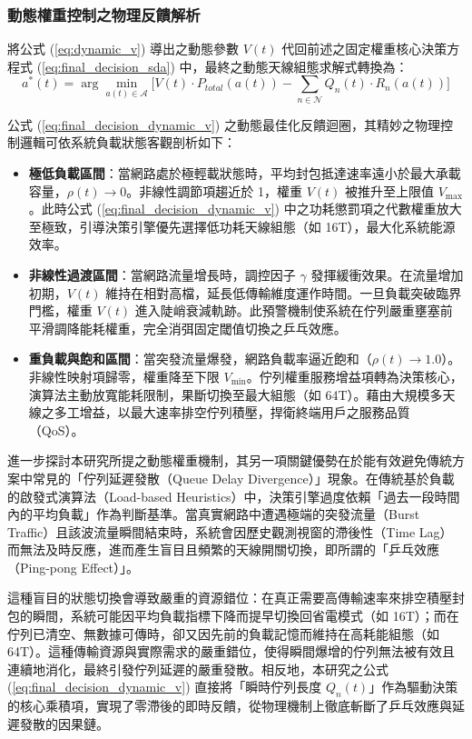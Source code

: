 \subsubsection{動態權重控制之物理反饋解析}
將公式 (\ref{eq:dynamic_v}) 導出之動態參數 $V(t)$ 代回前述之固定權重核心決策方程式 (\ref{eq:final_decision_sda}) 中，最終之動態天線組態求解式轉換為：
\begin{equation}
    a^*(t) = \arg\min_{a(t) \in \mathcal{A}} \Big[ V(t) \cdot P_{total}(a(t)) - \sum_{n \in \mathcal{N}} Q_n(t) \cdot R_n(a(t)) \Big]
    \label{eq:final_decision_dynamic_v}
\end{equation}

公式 (\ref{eq:final_decision_dynamic_v}) 之動態最佳化反饋迴圈，其精妙之物理控制邏輯可依系統負載狀態客觀剖析如下：
\begin{itemize}
    \item \textbf{極低負載區間}：當網路處於極輕載狀態時，平均封包抵達速率遠小於最大承載容量，$\rho(t) \to 0$。非線性調節項趨近於 1，權重 $V(t)$ 被推升至上限值 $V_{\text{max}}$。此時公式 (\ref{eq:final_decision_dynamic_v}) 中之功耗懲罰項之代數權重放大至極致，引導決策引擎優先選擇低功耗天線組態（如 16T），最大化系統能源效率。
    \item \textbf{非線性過渡區間}：當網路流量增長時，調控因子 $\gamma$ 發揮緩衝效果。在流量增加初期，$V(t)$ 維持在相對高檔，延長低傳輸維度運作時間。一旦負載突破臨界門檻，權重 $V(t)$ 進入陡峭衰減軌跡。此預警機制使系統在佇列嚴重壅塞前平滑調降能耗權重，完全消弭固定閾值切換之乒乓效應。
    \item \textbf{重負載與飽和區間}：當突發流量爆發，網路負載率逼近飽和（$\rho(t) \to 1.0$）。非線性映射項歸零，權重降至下限 $V_{\text{min}}$。佇列權重服務增益項轉為決策核心，演算法主動放寬能耗限制，果斷切換至最大組態（如 64T）。藉由大規模多天線之多工增益，以最大速率排空佇列積壓，捍衛終端用戶之服務品質（QoS）。
\end{itemize}

進一步探討本研究所提之動態權重機制，其另一項關鍵優勢在於能有效避免傳統方案中常見的「佇列延遲發散（Queue Delay Divergence）」現象。在傳統基於負載的啟發式演算法（Load-based Heuristics）中，決策引擎過度依賴「過去一段時間內的平均負載」作為判斷基準。當真實網路中遭遇極端的突發流量（Burst Traffic）且該波流量瞬間結束時，系統會因歷史觀測視窗的滯後性（Time Lag）而無法及時反應，進而產生盲目且頻繁的天線開關切換，即所謂的「乒乓效應（Ping-pong Effect）」。

這種盲目的狀態切換會導致嚴重的資源錯位：在真正需要高傳輸速率來排空積壓封包的瞬間，系統可能因平均負載指標下降而提早切換回省電模式（如 16T）；而在佇列已清空、無數據可傳時，卻又因先前的負載記憶而維持在高耗能組態（如 64T）。這種傳輸資源與實際需求的嚴重錯位，使得瞬間爆增的佇列無法被有效且連續地消化，最終引發佇列延遲的嚴重發散。相反地，本研究之公式 (\ref{eq:final_decision_dynamic_v}) 直接將「瞬時佇列長度 $Q_n(t)$」作為驅動決策的核心乘積項，實現了零滯後的即時反饋，從物理機制上徹底斬斷了乒乓效應與延遲發散的因果鏈。
